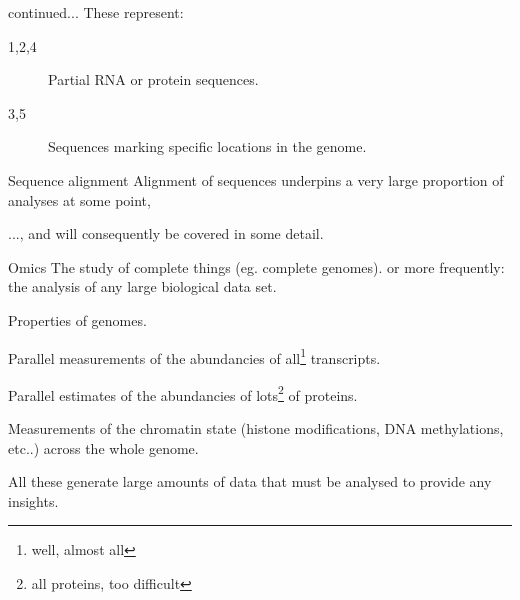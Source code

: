 \documentclass[pdf]{beamer}
\begin{document}
\begin{frame}{continued...}
  These represent:
  \begin{description}
  \item[1,2,4] Partial RNA or protein sequences.
  \item[3,5] Sequences marking specific locations in the genome.
    
  \end{description}
\end{frame}

\begin{frame}{Sequence alignment}
  Alignment of sequences underpins a very large proportion of analyses at some point,

  \pause
  ..., and will consequently be covered in some detail.

\end{frame}

\begin{frame}{Omics}
  The study of complete things (eg. complete genomes).
  \pause
  or more frequently:\\
  \hspace{2em}the analysis of any large biological data set.
  \pause
  \begin{description}[Transcriptomics]
  \item[Genomics] Properties of genomes.
  \item[Transcriptomics] Parallel measurements of the abundancies of all\footnote{well, almost all} transcripts.
  \item[Proteomics] Parallel estimates of the abundancies of lots\footnote{all proteins, too difficult} of proteins.
  \item[epigenomics?] Measurements of the chromatin state (histone modifications, DNA methylations, etc..) across the whole genome.
  \end{description}
  All these generate large amounts of data that must be analysed to provide
  any insights.

\end{frame}
\end{document}
